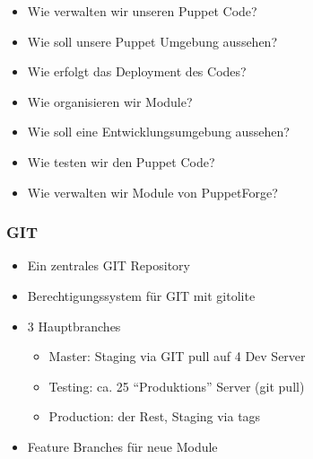 \documentclass{beamer}
\begin{document}
\begin{frame}
\end{frame}



\begin{frame}
  \begin{itemize}
  \item Wie verwalten wir unseren Puppet Code?
  \item Wie soll unsere Puppet Umgebung aussehen?
  \item Wie erfolgt das Deployment des Codes?
  \item Wie organisieren wir Module?
  \item Wie soll eine Entwicklungsumgebung aussehen?
  \item Wie testen wir den Puppet Code?
  \item Wie verwalten wir Module von PuppetForge?
  \end{itemize}
\end{frame}

\begin{frame}
\end{frame}

\begin{frame}
  \frametitle{GIT}

  \begin{itemize}
  \item Ein zentrales GIT Repository
  \item Berechtigungssystem für GIT mit gitolite
  \item 3 Hauptbranches
    \begin{itemize}
    \item Master: Staging via GIT pull auf 4 Dev Server
    \item Testing: ca. 25 ``Produktions'' Server (git pull)
    \item Production: der Rest, Staging via tags
    \end{itemize}
  \item Feature Branches für neue Module
  \end{itemize}
\end{frame}
\end{document}
